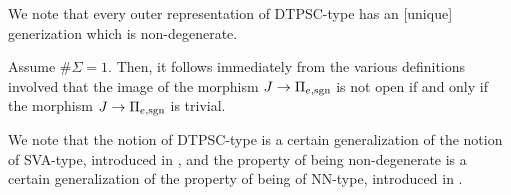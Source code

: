 \begin{rem}\label{RemarkUniqueGenerization}
  We note that every outer representation of DTPSC-type has an [unique] generization which is non-degenerate.
\end{rem}

\begin{rem}
  Assume $\# \Sigma = 1$. Then, it follows immediately from the various definitions involved that the image of the morphism $J \to \Pi_{e, \mathrm{sgn}}$ is not open if and only if the morphism $J \to \Pi_{e, \mathrm{sgn}}$ is trivial.
\end{rem}

\begin{rem}
  We note that the notion of DTPSC-type is a certain generalization of the notion of SVA-type, introduced in \cite[Definition 2.4, (ii)]{NodNon}, and the property of being non-degenerate is a certain generalization of the property of being of NN-type, introduced in \cite[Definition 2.4, (iii)]{NodNon}.
\end{rem}

